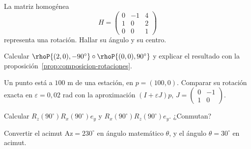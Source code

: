 \begin{ejercicio}
La matriz homogénea
\[
H=\begin{pmatrix}0&-1&4\\1&0&2\\0&0&1\end{pmatrix}
\]
representa una rotación. Hallar su
ángulo y su centro.
\end{ejercicio}

\begin{ejercicio}
Calcular \(\rhoP{(2,0),-90^\circ}\circ\rhoP{(0,0),90^\circ}\) y explicar el resultado con la
proposición~\ref{prop:composicion-rotaciones}.
\end{ejercicio}

\begin{ejercicio}
Un punto está a \(100\) m de una estación, en \(p=(100,0)\). Comparar su rotación exacta en
\(\varepsilon=0{,}02\) rad con la aproximación \((I+\varepsilon J)p\),
\(J=\left(\begin{smallmatrix}0&-1\\1&0\end{smallmatrix}\right)\).
\end{ejercicio}

\begin{ejercicio}
Calcular \(R_z(90^\circ)R_x(90^\circ)e_y\) y \(R_x(90^\circ)R_z(90^\circ)e_y\). ¿Conmutan?
\end{ejercicio}

\begin{ejercicio}
Convertir el acimut \(\mathrm{Az}=230^\circ\) en ángulo matemático \(\theta\), y el ángulo
\(\theta=30^\circ\) en acimut.
\end{ejercicio}
